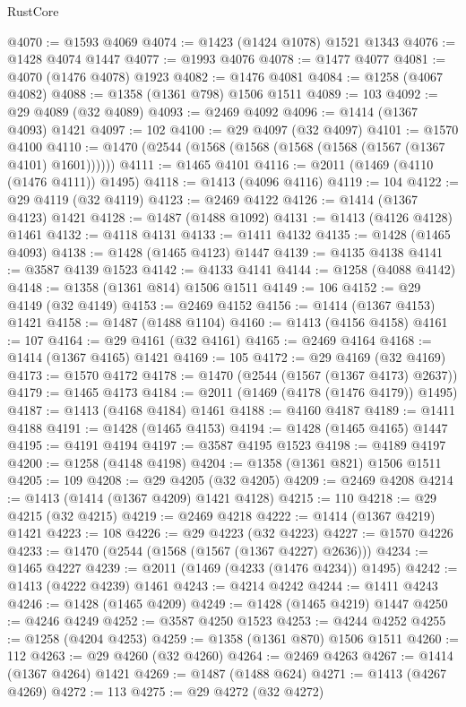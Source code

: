 \begin{lexlean}{RustCore}
\begin{coremodule}
{\begin{coremodule}
{{{{{{{{{{{{{{{{{{{{{{{{{{{{{{{{{{{{{{{{{{{{{{{@4070 := @1593 @4069
@4074 := @1423 (@1424 @1078) @1521 @1343
@4076 := @1428 @4074 @1447
@4077 := @1993 @4076
@4078 := @1477 @4077
@4081 := @4070 (@1476 @4078) @1923
@4082 := @1476 @4081
@4084 := @1258 (@4067 @4082)
@4088 := @1358 (@1361 @798) @1506 @1511
@4089 := 103
@4092 := @29 @4089 (@32 @4089)
@4093 := @2469 @4092
@4096 := @1414 (@1367 @4093) @1421
@4097 := 102
@4100 := @29 @4097 (@32 @4097)
@4101 := @1570 @4100
@4110 := @1470 (@2544 (@1568 (@1568 (@1568 (@1568 (@1567 (@1367 @4101) @1601))))))
@4111 := @1465 @4101
@4116 := @2011 (@1469 (@4110 (@1476 @4111)) @1495)
@4118 := @1413 (@4096 @4116)
@4119 := 104
@4122 := @29 @4119 (@32 @4119)
@4123 := @2469 @4122
@4126 := @1414 (@1367 @4123) @1421
@4128 := @1487 (@1488 @1092)
@4131 := @1413 (@4126 @4128) @1461
@4132 := @4118 @4131
@4133 := @1411 @4132
@4135 := @1428 (@1465 @4093)
@4138 := @1428 (@1465 @4123) @1447
@4139 := @4135 @4138
@4141 := @3587 @4139 @1523
@4142 := @4133 @4141
@4144 := @1258 (@4088 @4142)
@4148 := @1358 (@1361 @814) @1506 @1511
@4149 := 106
@4152 := @29 @4149 (@32 @4149)
@4153 := @2469 @4152
@4156 := @1414 (@1367 @4153) @1421
@4158 := @1487 (@1488 @1104)
@4160 := @1413 (@4156 @4158)
@4161 := 107
@4164 := @29 @4161 (@32 @4161)
@4165 := @2469 @4164
@4168 := @1414 (@1367 @4165) @1421
@4169 := 105
@4172 := @29 @4169 (@32 @4169)
@4173 := @1570 @4172
@4178 := @1470 (@2544 (@1567 (@1367 @4173) @2637))
@4179 := @1465 @4173
@4184 := @2011 (@1469 (@4178 (@1476 @4179)) @1495)
@4187 := @1413 (@4168 @4184) @1461
@4188 := @4160 @4187
@4189 := @1411 @4188
@4191 := @1428 (@1465 @4153)
@4194 := @1428 (@1465 @4165) @1447
@4195 := @4191 @4194
@4197 := @3587 @4195 @1523
@4198 := @4189 @4197
@4200 := @1258 (@4148 @4198)
@4204 := @1358 (@1361 @821) @1506 @1511
@4205 := 109
@4208 := @29 @4205 (@32 @4205)
@4209 := @2469 @4208
@4214 := @1413 (@1414 (@1367 @4209) @1421 @4128)
@4215 := 110
@4218 := @29 @4215 (@32 @4215)
@4219 := @2469 @4218
@4222 := @1414 (@1367 @4219) @1421
@4223 := 108
@4226 := @29 @4223 (@32 @4223)
@4227 := @1570 @4226
@4233 := @1470 (@2544 (@1568 (@1567 (@1367 @4227) @2636)))
@4234 := @1465 @4227
@4239 := @2011 (@1469 (@4233 (@1476 @4234)) @1495)
@4242 := @1413 (@4222 @4239) @1461
@4243 := @4214 @4242
@4244 := @1411 @4243
@4246 := @1428 (@1465 @4209)
@4249 := @1428 (@1465 @4219) @1447
@4250 := @4246 @4249
@4252 := @3587 @4250 @1523
@4253 := @4244 @4252
@4255 := @1258 (@4204 @4253)
@4259 := @1358 (@1361 @870) @1506 @1511
@4260 := 112
@4263 := @29 @4260 (@32 @4260)
@4264 := @2469 @4263
@4267 := @1414 (@1367 @4264) @1421
@4269 := @1487 (@1488 @624)
@4271 := @1413 (@4267 @4269)
@4272 := 113
@4275 := @29 @4272 (@32 @4272)
}}}}}}}}}}}}}}}}}}}}}}}}}}}}}}}}}}}}}}}}}}}}}}}
\end{coremodule}}
\end{coremodule}
\end{lexlean}
